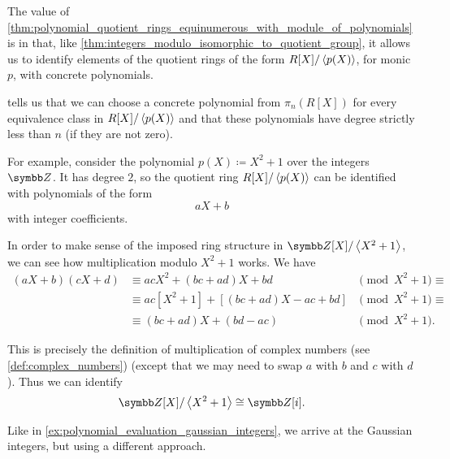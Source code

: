\begin{example}\label{ex:polynomial_quotient_rings_gaussian_integers}
  The value of \cref{thm:polynomial_quotient_rings_equinumerous_with_module_of_polynomials} is in that, like \cref{thm:integers_modulo_isomorphic_to_quotient_group}, it allows us to identify elements of the quotient rings of the form \( R[X] / \left\langle p(X) \right\rangle \), for monic \( p \), with concrete polynomials.

   tells us that we can choose a concrete polynomial from \( \pi_n(R[X]) \) for every equivalence class in \( R[X] / \left\langle p(X) \right\rangle \) and that these polynomials have degree strictly less than \( n \) (if they are not zero).

  For example, consider the polynomial \( p(X) \coloneqq X^2 + 1 \) over the integers \( \Z \). It has degree \( 2 \), so the quotient ring \( R[X] / \left\langle p(X) \right\rangle \) can be identified with polynomials of the form
  \begin{equation}\label{ex:polynomial_quotient_rings_gaussian_integers/linear_polynomial}
    aX + b
  \end{equation}
  with integer coefficients.

  In order to make sense of the imposed ring structure in \( \Z[X] / \Gen{X^2 + 1} \), we can see how multiplication modulo \( X^2 + 1 \) works. We have
  \begin{align*}
    (aX + b) (cX + d)
    &\equiv
    acX^2 + (bc + ad)X + bd
    &\pmod {X^2 + 1} \equiv \\ &\equiv
    ac[X^2 + 1] + [(bc + ad)X - ac + bd]
    &\pmod {X^2 + 1} \equiv \\ &\equiv
    (bc + ad)X + (bd - ac)
    &\pmod {X^2 + 1}. \phantom{\equiv}
  \end{align*}

  This is precisely the definition of multiplication of complex numbers (see \cref{def:complex_numbers}) (except that we may need to swap \( a \) with \( b \) and \( c \) with \( d \)). Thus we can identify
  \begin{equation*}
    \Z[X] / \Gen{X^2 + 1} \cong \Z[i].
  \end{equation*}

  Like in \cref{ex:polynomial_evaluation_gaussian_integers}, we arrive at the Gaussian integers, but using a different approach.
\end{example}

